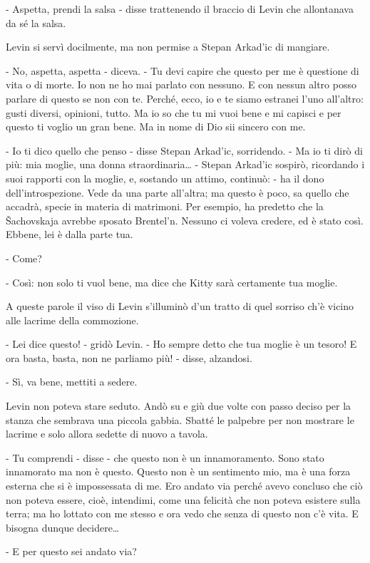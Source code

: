 - Aspetta, prendi la salsa - disse trattenendo il braccio di Levin che allontanava da sé la salsa. 

Levin si servì docilmente, ma non permise a Stepan Arkad'ic di mangiare. 

- No, aspetta, aspetta - diceva. - Tu devi capire che questo per me è questione di vita o di morte. Io non ne ho mai parlato con nessuno. E con nessun altro posso parlare di questo se non con te. Perché, ecco, io e te siamo estranei l'uno all'altro: gusti diversi, opinioni, tutto. Ma io so che tu mi vuoi bene e mi capisci e per questo ti voglio un gran bene. Ma in nome di Dio sii sincero con me. 

- Io ti dico quello che penso - disse Stepan Arkad'ic, sorridendo. - Ma io ti dirò di più: mia moglie, una donna straordinaria\ldots{} - Stepan Arkad'ic sospirò, ricordando i suoi rapporti con la moglie, e, sostando un attimo, continuò: - ha il dono dell'introspezione. Vede da una parte all'altra; ma questo è poco, sa quello che accadrà, specie in materia di matrimoni. Per esempio, ha predetto che la Šachovskaja avrebbe sposato Brentel'n. Nessuno ci voleva credere, ed è stato così. Ebbene, lei è dalla parte tua. 

- Come? 

- Così: non solo ti vuol bene, ma dice che Kitty sarà certamente tua moglie. 

A queste parole il viso di Levin s'illuminò d'un tratto di quel sorriso ch'è vicino alle lacrime della commozione. 

- Lei dice questo! - gridò Levin. - Ho sempre detto che tua moglie è un tesoro! E ora basta, basta, non ne parliamo più! - disse, alzandosi. 

- Sì, va bene, mettiti a sedere. 

Levin non poteva stare seduto. Andò su e giù due volte con passo deciso per la stanza che sembrava una piccola gabbia. Sbatté le palpebre per non mostrare le lacrime e solo allora sedette di nuovo a tavola. 

- Tu comprendi - disse - che questo non è un innamoramento. Sono stato innamorato ma non è questo. Questo non è un sentimento mio, ma è una forza esterna che si è impossessata di me. Ero andato via perché avevo concluso che ciò non poteva essere, cioè, intendimi, come una felicità che non poteva esistere sulla terra; ma ho lottato con me stesso e ora vedo che senza di questo non c'è vita. E bisogna dunque decidere\ldots{} 

- E per questo sei andato via? 

